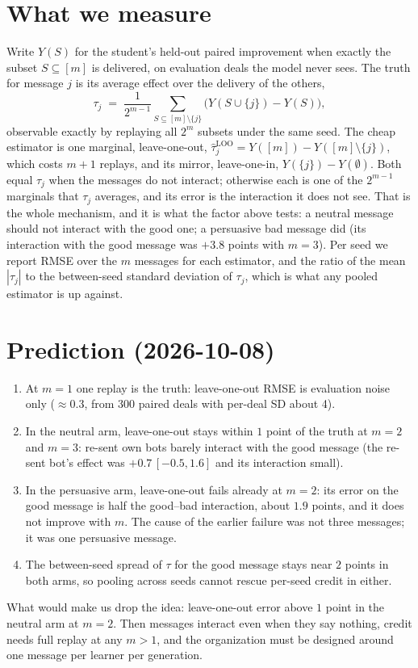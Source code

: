 \documentclass[11pt]{article}
\begin{document}
\section{What we measure}
Write $Y(S)$ for the student's held-out paired improvement when exactly the subset $S\subseteq[m]$ is delivered,
on evaluation deals the model never sees. The truth for message $j$ is its average effect over the delivery of
the others,
\[
\tau_j \;=\; \frac{1}{2^{m-1}}\sum_{S\subseteq[m]\setminus\{j\}}\bigl(Y(S\cup\{j\})-Y(S)\bigr),
\]
observable exactly by replaying all $2^m$ subsets under the same seed. The cheap estimator is one marginal,
leave-one-out, $\hat\tau_j^{\mathrm{LOO}} = Y([m]) - Y([m]\setminus\{j\})$, which costs $m+1$ replays, and its
mirror, leave-one-in, $Y(\{j\})-Y(\emptyset)$. Both equal $\tau_j$ when the messages do not interact; otherwise
each is one of the $2^{m-1}$ marginals that $\tau_j$ averages, and its error is the interaction it does not see.
That is the whole mechanism, and it is what the factor above tests: a neutral message should not interact with
the good one; a persuasive bad message did (its interaction with the good message was $+3.8$ points with
$m=3$). Per seed we report RMSE over the $m$ messages for each estimator, and the ratio of the mean $|\tau_j|$
to the between-seed standard deviation of $\tau_j$, which is what any pooled estimator is up against.

\section{Prediction (2026-10-08)}
\begin{enumerate}
  \item At $m=1$ one replay is the truth: leave-one-out RMSE is evaluation noise only ($\approx 0.3$, from
  300 paired deals with per-deal SD about 4).
  \item In the neutral arm, leave-one-out stays within $1$ point of the truth at $m=2$ and $m=3$: re-sent own
  bots barely interact with the good message (the re-sent bot's effect was $+0.7\,[-0.5,1.6]$ and its
  interaction small).
  \item In the persuasive arm, leave-one-out fails already at $m=2$: its error on the good message is half the
  good--bad interaction, about $1.9$ points, and it does not improve with $m$. The cause of the earlier failure
  was not three messages; it was one persuasive message.
  \item The between-seed spread of $\tau$ for the good message stays near $2$ points in both arms, so pooling
  across seeds cannot rescue per-seed credit in either.
\end{enumerate}
What would make us drop the idea: leave-one-out error above $1$ point in the neutral arm at $m=2$. Then
messages interact even when they say nothing, credit needs full replay at any $m>1$, and the organization must
be designed around one message per learner per generation.
\end{document}
